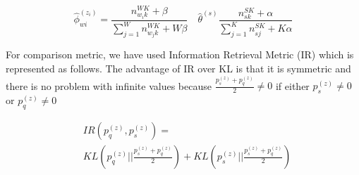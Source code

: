 \documentclass[landscape,final]{baposter}
\begin{document}
\begin{poster}
{\begin{equation*}
  \label{eq:model}
    \hat{ \phi}_{wi}^{(z_i)} = \frac{n^{WK}_{w_{i}k}+ \beta}{\sum^W_{j=1}n^{WK}_{w_{j}k}+ W \beta} \quad \hat{\theta}^{(s)} \frac{n^{SK}_{sk} +\alpha}{\sum^K_{j=1}n^{SK}_{sj}+ K \alpha}
\end{equation*}

	\par For comparison metric, we have used Information Retrieval Metric (IR) which is represented as follows. The advantage of IR over KL is that it is symmetric and there is no problem with infinite values because $\frac{p^{(z)}_{s}+p^{(z)}_{q}}{2} \neq 0$ if either $p^{(z)}_{s} \neq 0$ or $p^{(z)}_{q} \neq 0$

\begin{equation*}
  \label{eq:metric}
\begin{aligned}
&IR(p^{(z)}_{q},p^{(z)}_{s}) = \\
&KL(p^{(z)}_{q}||\frac{p^{(z)}_{s}+p^{(z)}_{q}}{2}) + KL(p^{(z)}_{s}||\frac{p^{(z)}_{s}+p^{(z)}_{q}}{2})
\end{aligned}
\end{equation*}
  }
\end{poster}
\end{document}
